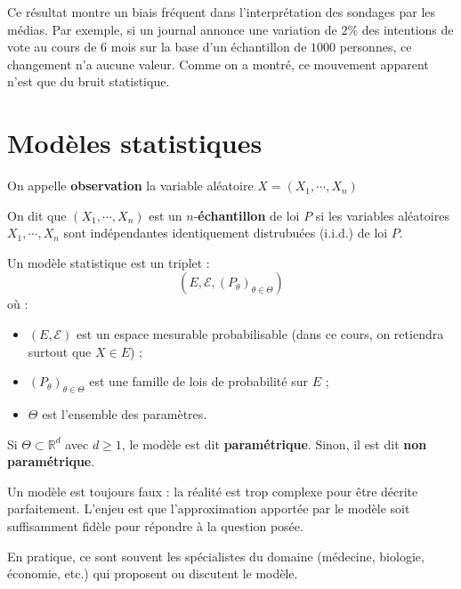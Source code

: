 Ce résultat montre un biais fréquent dans l'interprétation des sondages par les médias. Par exemple, si un journal annonce une variation de $2 \%$ des intentions de vote au cours de $6$ mois sur la base d'un échantillon de $1000$ personnes, ce changement n'a aucune valeur. Comme on a montré, ce mouvement apparent n'est que du bruit statistique.

\newpage

\section{Modèles statistiques}

\begin{definition}
On appelle \textbf{observation} la variable aléatoire $X = ( X_1 , \cdots , X_n)$

On dit que $( X_1 , \cdots , X_n)$  est un $n$-\textbf{échantillon} de loi $P$ si les variables aléatoires $X_1 , \cdots , X_n$ sont indépendantes identiquement distrubuées (i.i.d.) de loi $P$.
\end{definition}

\smallskip

\begin{mdframed}
\begin{definition}
Un modèle statistique est un triplet :
\[
(E, \mathcal{E}, (P_\theta)_{\theta \in \Theta})
\]
où :
\begin{itemize}
  \item $(E, \mathcal{E})$ est un espace mesurable probabilisable (dans ce cours, on retiendra surtout que $X \in E$) ;
  \item $(P_\theta)_{\theta \in \Theta}$ est une famille de lois de probabilité sur $E$ ;
  \item $\Theta$ est l'ensemble des paramètres.
\end{itemize}

Si $\Theta \subset \mathbb{R}^d$ avec $d \geq 1$, le modèle est dit \textbf{paramétrique}.  
Sinon, il est dit \textbf{non paramétrique}.
\end{definition}
\end{mdframed}

\smallskip

\begin{remarque}
Un modèle est toujours faux : la réalité est trop complexe pour être décrite parfaitement. L'enjeu est que l'approximation apportée par le modèle soit suffisamment fidèle pour répondre à la question posée.  

En pratique, ce sont souvent les spécialistes du domaine (médecine, biologie, économie, etc.) qui proposent ou discutent le modèle.
\end{remarque}

